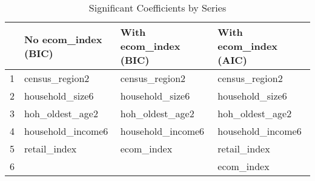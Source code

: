 \begin{table}[ht]
\centering
\caption{Significant Coefficients by Series} 
\label{tab:series_coefs}
\begin{tabular}{rlll}
  \hline
 & No ecom\_index (BIC) & With ecom\_index (BIC) & With ecom\_index (AIC) \\ 
  \hline
1 & census_region2 & census_region2 & census_region2 \\ 
  2 & household_size6 & household_size6 & household_size6 \\ 
  3 & hoh_oldest_age2 & hoh_oldest_age2 & hoh_oldest_age2 \\ 
  4 & household_income6 & household_income6 & household_income6 \\ 
  5 & retail_index & ecom_index & retail_index \\ 
  6 &  &  & ecom_index \\ 
   \hline
\end{tabular}
\end{table}
